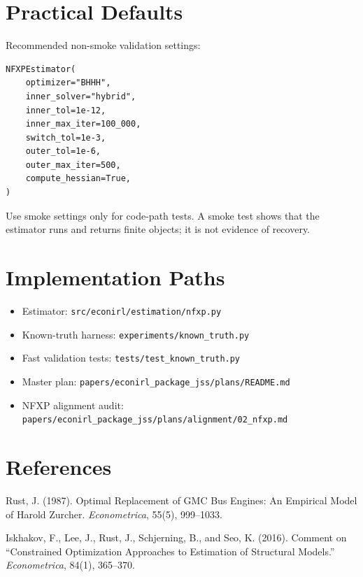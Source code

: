 \documentclass[10pt]{article}
\begin{document}
\section{Practical Defaults}

Recommended non-smoke validation settings:

\begin{lstlisting}
NFXPEstimator(
    optimizer="BHHH",
    inner_solver="hybrid",
    inner_tol=1e-12,
    inner_max_iter=100_000,
    switch_tol=1e-3,
    outer_tol=1e-6,
    outer_max_iter=500,
    compute_hessian=True,
)
\end{lstlisting}

Use smoke settings only for code-path tests. A smoke test shows that the
estimator runs and returns finite objects; it is not evidence of recovery.

\section{Implementation Paths}

\begin{itemize}
\item Estimator: \texttt{src/econirl/estimation/nfxp.py}
\item Known-truth harness: \texttt{experiments/known\_truth.py}
\item Fast validation tests: \texttt{tests/test\_known\_truth.py}
\item Master plan: \texttt{papers/econirl\_package\_jss/plans/README.md}
\item NFXP alignment audit: \texttt{papers/econirl\_package\_jss/plans/alignment/02\_nfxp.md}
\end{itemize}

\section{References}

Rust, J. (1987). Optimal Replacement of GMC Bus Engines: An Empirical Model of
Harold Zurcher. \emph{Econometrica}, 55(5), 999--1033.

Iskhakov, F., Lee, J., Rust, J., Schjerning, B., and Seo, K. (2016). Comment on
``Constrained Optimization Approaches to Estimation of Structural Models.''
\emph{Econometrica}, 84(1), 365--370.
\end{document}
